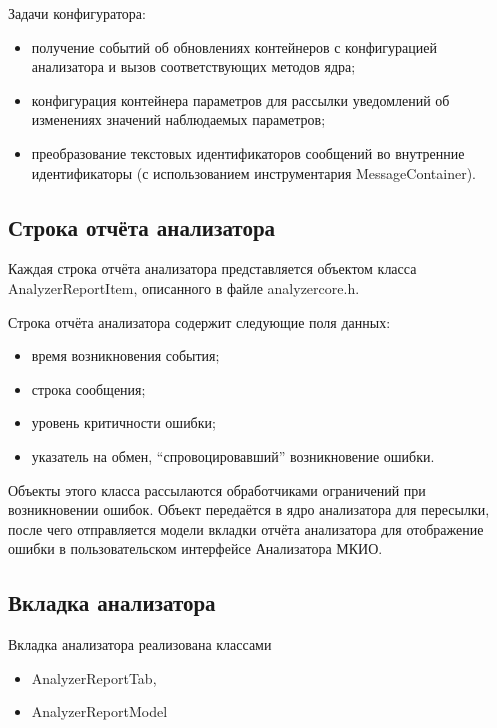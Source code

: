 Задачи конфигуратора:

\begin{itemize}
 \item получение событий об обновлениях контейнеров с конфигурацией анализатора 
и вызов соответствующих методов ядра;
 \item конфигурация контейнера параметров для рассылки уведомлений об 
изменениях значений наблюдаемых параметров;
 \item преобразование текстовых идентификаторов сообщений во внутренние 
идентификаторы (с использованием инструментария MessageContainer).
\end{itemize}

\subsection{Строка отчёта анализатора}
\label{subsec:reportitem}

Каждая строка отчёта анализатора представляется объектом класса 
AnalyzerReportItem, описанного в файле analyzercore.h.

Строка отчёта анализатора содержит следующие поля данных:

\begin{itemize}
 \item время возникновения события;
 \item строка сообщения;
 \item уровень критичности ошибки;
 \item указатель на обмен, ``спровоцировавший'' возникновение ошибки.
\end{itemize}

Объекты этого класса рассылаются обработчиками ограничений при возникновении 
ошибок. Объект передаётся в ядро анализатора для пересылки, после чего 
отправляется модели вкладки отчёта анализатора для отображение ошибки в 
пользовательском интерфейсе Анализатора МКИО.

\subsection{Вкладка анализатора}

Вкладка анализатора реализована классами

\begin{itemize}
 \item AnalyzerReportTab,
 \item AnalyzerReportModel
\end{itemize}

